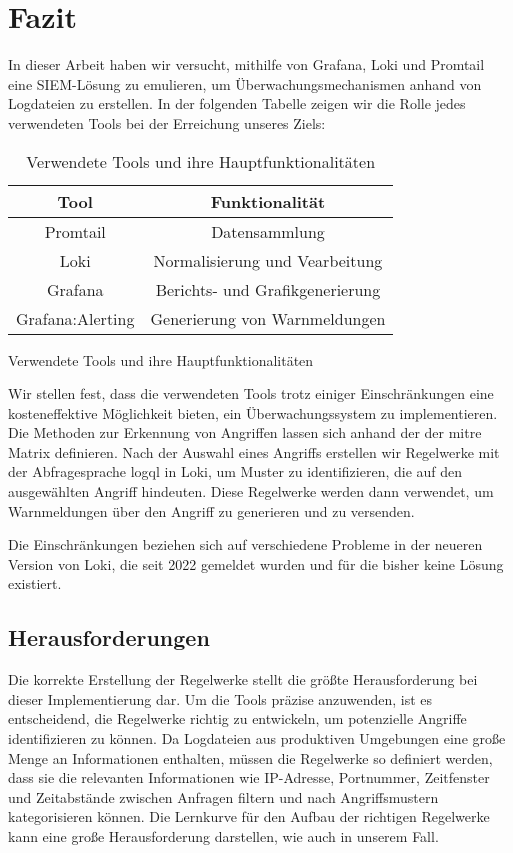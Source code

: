 \section{Fazit}

In dieser Arbeit haben wir versucht, mithilfe von Grafana, Loki und Promtail eine \gls{SIEM}-Lösung zu emulieren, um Überwachungsmechanismen anhand von Logdateien zu erstellen. In der folgenden Tabelle zeigen wir die Rolle jedes verwendeten Tools bei der Erreichung unseres Ziels:

\begin{table}[h]
    \centering
    \begin{tabular}{|c|c|}
    \hline
    \textbf{Tool}    & \textbf{Funktionalität}         \\ \hline
    Promtail         & Datensammlung                   \\ \hline
    Loki             & Normalisierung und Vearbeitung  \\ \hline
    Grafana          & Berichts- und Grafikgenerierung \\ \hline
    Grafana:Alerting & Generierung von Warnmeldungen   \\ \hline
    \end{tabular}
    \caption{Verwendete Tools und ihre Hauptfunktionalitäten} 
    {Verwendete Tools und ihre Hauptfunktionalitäten}
    \label{tab:VerewendeteTools}
\end{table}

Wir stellen fest, dass die verwendeten Tools trotz einiger Einschränkungen eine kosteneffektive Möglichkeit bieten, ein Überwachungssystem zu implementieren. Die Methoden zur Erkennung von Angriffen lassen sich anhand der  der \gls{mitre} Matrix definieren. Nach der Auswahl eines Angriffs erstellen wir Regelwerke mit der Abfragesprache \gls{logql} in Loki, um Muster zu identifizieren, die auf den ausgewählten Angriff hindeuten. Diese Regelwerke werden dann verwendet, um Warnmeldungen über den Angriff zu generieren und zu versenden.

Die Einschränkungen beziehen sich auf verschiedene Probleme in der neueren Version von Loki, die seit 2022 gemeldet wurden und für die bisher keine Lösung existiert.

\subsection{Herausforderungen}
Die korrekte Erstellung der Regelwerke stellt die größte Herausforderung bei dieser Implementierung dar. Um die Tools präzise anzuwenden, ist es entscheidend, die Regelwerke richtig zu entwickeln, um potenzielle Angriffe identifizieren zu können. Da Logdateien aus produktiven Umgebungen eine große Menge an Informationen enthalten, müssen die Regelwerke so definiert werden, dass sie die relevanten Informationen wie IP-Adresse, Portnummer, Zeitfenster und Zeitabstände zwischen Anfragen filtern und nach Angriffsmustern kategorisieren können. Die Lernkurve für den Aufbau der richtigen Regelwerke kann eine große Herausforderung darstellen, wie auch in unserem Fall.

